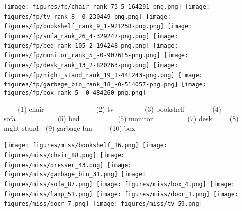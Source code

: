\documentclass[10pt,twocolumn,letterpaper]{article}
\begin{document}
\begin{figure*}[t]
\caption{{\bf Top True Positives.}}
\label{fig:resultTP}


\vspace{2mm}

\texttt{[image: figures/fp/chair\_rank\_73\_5-164291-png.png]}~\texttt{[image: figures/fp/tv\_rank\_8\_-0-230449-png.png]}~\texttt{[image: figures/fp/bookshelf\_rank\_9\_1-921258-png.png]}~\texttt{[image: figures/fp/sofa\_rank\_26\_4-329247-png.png]}~\texttt{[image: figures/fp/bed\_rank\_105\_2-194248-png.png]}~\texttt{[image: figures/fp/monitor\_rank\_5\_-0-907615-png.png]}~\texttt{[image: figures/fp/desk\_rank\_13\_2-820263-png.png]}~\texttt{[image: figures/fp/night\_stand\_rank\_19\_1-441243-png.png]}~\texttt{[image: figures/fp/garbage\_bin\_rank\_18\_-0-514057-png.png]}~\texttt{[image: figures/fp/box\_rank\_5\_-0-484260-png.png]}

\vspace{-0.5mm}

{\footnotesize

~~~~(1) chair~~~~~~~~~~~~~~~(2) tv~~~~~~~~~(3) bookshelf~~~~~~~~(4) sofa~~~~~~~~~~~~(5) bed~~~~~~~~~~~(6) monitor~~~~~~~~~~(7) desk~~~~~(8) night stand~~(9) garbage bin~~~~~(10) box


}



\caption{{\bf Top False Positives.}
(1)-(2) show detections with inaccurate locations.
(3)-(6) show detections with wrong box size for the big bookshelf, L-shape sofa, bunk bed, and monitor. 
(7)-(10) show detections with wrong categories.}
\label{fig:resultFP}



\vspace{2mm}

\texttt{[image: figures/miss/bookshelf\_16.png]}~\texttt{[image: figures/miss/chair\_88.png]}~\texttt{[image: figures/miss/dresser\_43.png]}~\texttt{[image: figures/miss/garbage\_bin\_31.png]}~\texttt{[image: figures/miss/sofa\_87.png]}~\texttt{[image: figures/miss/box\_4.png]}~\texttt{[image: figures/miss/lamp\_51.png]}~\texttt{[image: figures/miss/door\_1.png]}~\texttt{[image: figures/miss/door\_7.png]}~\texttt{[image: figures/miss/tv\_59.png]}


\end{figure*}
\end{document}

